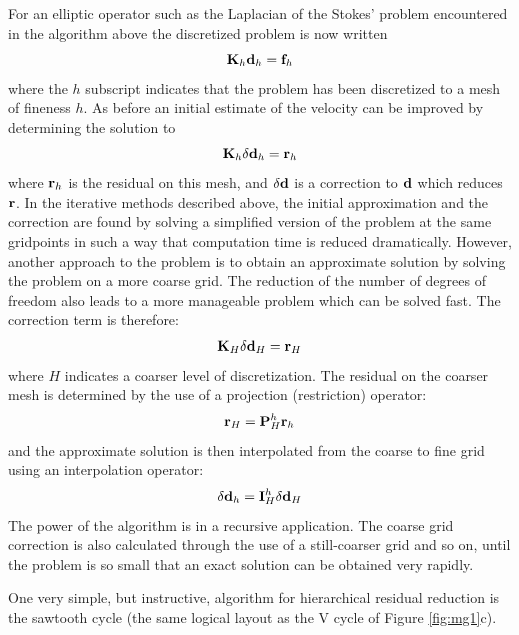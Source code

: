 \documentclass[10pt]{article}
\begin{document}
	For an elliptic operator such as the Laplacian of the Stokes' problem 
	encountered in the algorithm above the discretized problem is now written
		\begin{equation}
		  {\bf K}_h {\bf d}_h = {\bf f}_h
		\end{equation}
	where  the $h$ subscript indicates that the problem has been discretized
	to a mesh of fineness $h$.  As before an initial estimate of the velocity
	can be improved by determining the solution to
		\begin{equation}
		  {\bf K}_h \delta {\bf d}_h = {\bf r}_h
		\end{equation}
	where ${\bf r}_h$ is the residual on this mesh, and
	$\delta {\bf d}$ is a correction to $\bf d$ which reduces $\bf r$.
	 In the iterative methods
	described above, the initial approximation and the correction are found
	by solving a simplified version of the problem at the same gridpoints
	in such a way that computation time is reduced dramatically.
	However, another approach to the problem is to obtain an approximate
	solution by solving the problem on a more coarse grid. The reduction
	of the number of degrees of freedom also leads to a more manageable
	problem which can be solved fast. The correction term is therefore:
		\begin{equation}
		  {\bf K}_H \delta{\bf d}_H = {\bf r}_H
		\end{equation}
	where $H$ indicates a coarser level of discretization. The residual
	on the coarser mesh is determined by the use of a projection (restriction)
	operator:
		\begin{equation}
		  {\bf r}_H = {\bf P}_H^h {\bf r}_h
		\end{equation}
	and the approximate solution is then interpolated from the coarse
	to fine grid using an interpolation operator:
		\begin{equation}
		  \delta{\bf d}_h = {\bf I}_H^h \delta{\bf d}_H
		\end{equation}
	The power of the algorithm is in a recursive application. The 
	coarse grid correction is also calculated through the use of a
	still-coarser grid and so on, until the problem is so small
	that an exact solution can be obtained very rapidly.
	
	One very simple, but instructive, algorithm for hierarchical
	residual reduction is the sawtooth cycle (the same logical layout
	as the V cycle of Figure \ref{fig:mg1}c).
	
\end{document}

